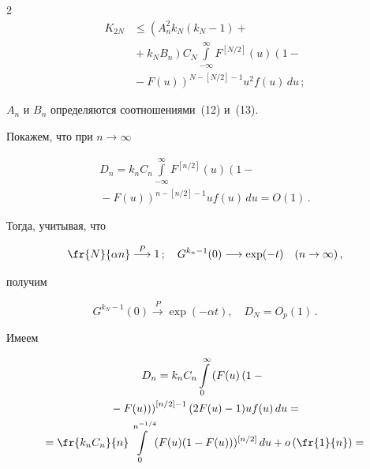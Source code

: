 \begin{multicols}{2}
\begin{align*}
K_{2N}&\leq


\left ( A_n^2k_N(k_N-1)+{}\right.\\


&{}+\left.k_NB_n\right )C_N\int\limits_{-\infty}^{\infty}F^{[N/2]}(u)\left (1-{}\right.\\


&\left. {}- F(u)\right )^{N-[N/2]-1}u^2f(u)\,du\,;


\end{align*} 


$A_n$ и $B_n$ определяются соотношениями~(12) и~(13).





Покажем, что при $n \to \infty$


\begin{multline*}


D_n=k_nC_n\int\limits_{-\infty}^{\infty}F^{[n/2]}(u)\left ( 1-{}\right.\\


\left. {}-F(u)\right )^{n-[n/2]-1}


uf(u)\,du=O(1)\,.


\end{multline*}


Тогда, учитывая, что 


$$


\fr{N}{\alpha n}\stackrel{P}{\longrightarrow}1\,;\quad 


G^{k_n-1}(0)\longrightarrow \exp(-t) \quad (n \to \infty)\,,


$$ 


получим


$$


G^{k_N-1}(0)\stackrel{P}{\longrightarrow}\exp(-\alpha t), \quad


D_N=O_p(1)\,. 


$$ 


Имеем 


\begin{multline*}


D_n=k_nC_n\int\limits_{0}^{\infty}\left (F(u)\left ( 1-{}\right.\right.\\


\left.\left.{}-F(u)\right )\right )^{[n/2]-1}(2F(u)-1)uf(u)\,du={}\\


{}=\fr{k_nC_n}{n}\int\limits_{0}^{n^{-1/4}}(F(u)(1-F(u)))^{[n/2]}\,du+


o\left(\fr{1}{n}\right)={}\\



\end{multline*}
\end{multicols}
